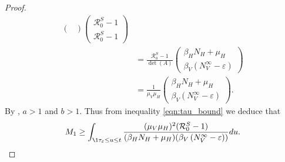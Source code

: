 \begin{proof}
\begin{equation}
\begin{aligned}
\begin{pmatrix}
            \end{pmatrix}
            \begin{pmatrix}
                \mathcal{R}_0 ^ S - 1
                \\
                \mathcal{R}_0 ^ S - 1
            \end{pmatrix}
            \\
            & =
            \frac{\mathcal{R}_0 ^ S - 1}{\det(A)}
            \begin{pmatrix}
                \beta_H N_H + \mu_H
                \\
                \beta_V \left(N_V ^ {\infty} -\varepsilon\right)
            \end{pmatrix}
            \\
            & =
            \frac{1}{\mu_V \mu_H}
            \begin{pmatrix}
                \beta_H N_H + \mu_H
                \\
                \beta_V \left(N_V ^ {\infty} -\varepsilon\right)
            \end{pmatrix}.
        \end{aligned}
    \end{equation}
%
%
%
%
    By , $a>1$ and $b>1$. Thus from inequality
    \eqref{eqn:tau_bound} we deduce that
    \begin{equation} \label{eqn:T1_equivalence}
        M_1 \geq 
        \int_{\1{\tau_\varepsilon \leq u \leq t}}
        \dfrac{
            (\mu_V \mu_H) ^ 2 (\mathcal{R}_0 ^ S - 1)
        }{
            (\beta_H N_H + \mu_H) 
            (\beta_V \left(N_V ^ {\infty} -\varepsilon\right))
        }
         du.
    \end{equation}
    

\end{proof}
